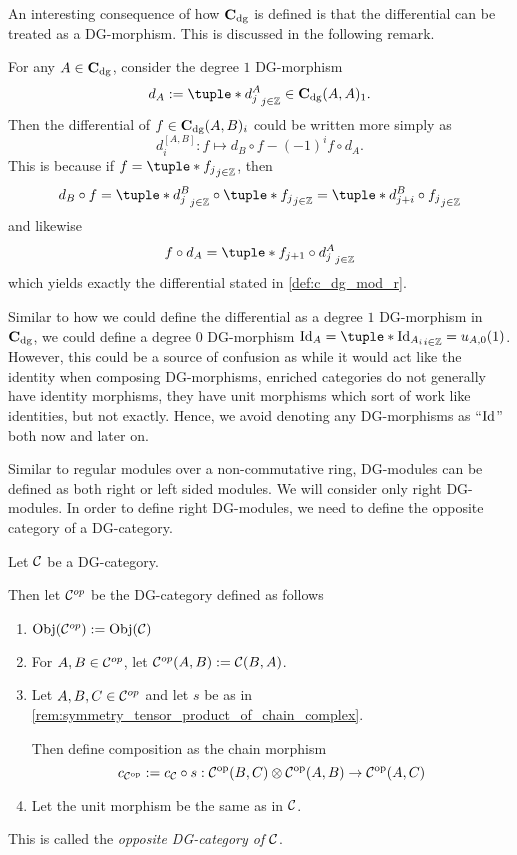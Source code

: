 An interesting consequence of how \( \operatorname{\mathbf{C}}_{\operatorname{dg}} \) is defined is that the differential can be treated as a DG-morphism. This is discussed in the following remark.
\begin{remark}
    \label{rem:c_dg_differential}
    For any \( A \in \operatorname{\mathbf{C}}_{\operatorname{dg}} \), consider the degree \( 1 \) DG-morphism
    \[
        d_A := \tuple*{ d_j^A }_{j \in \Zb} \in \C_{\dg}(A, A)_1.
    \]
    Then the differential of \( f \in \operatorname{\mathbf{C}}_{\operatorname{dg}}(A, B)_i \) could be written more simply as
    \[
        d_i^{[A, B]}: f \mapsto d_B \circ f - (-1)^i f \circ d_A.
    \]
    This is because if \( f = \tuple*{f_j}_{j \in \Zb} \), then
    \[
        d_B \circ f = \tuple*{d_j^B }_{j \in \Zb} \circ \tuple*{ f_j }_{j \in \Zb} = \tuple*{ d_{j + i}^B \circ f_j }_{j \in \Zb}
    \]
    and likewise
    \[
        f \circ d_A = \tuple*{f_{j + 1} \circ d_j^A}_{j \in \Zb}
    \]
    which yields exactly the differential stated in \autoref{def:c_dg_mod_r}.
\end{remark}

Similar to how we could define the differential as a degree \( 1 \) DG-morphism in \( \operatorname{\mathbf{C}}_{\operatorname{dg}} \), we could define a degree \( 0 \) DG-morphism \( \Id_A = \tuple*{ \Id_{A_i} }_{i \in \Zb} = u_{A, 0}(1) \). However, this could be a source of confusion as while it would act like the identity when composing DG-morphisms, enriched categories do not generally have identity morphisms, they have unit morphisms which sort of work like identities, but not exactly. Hence, we avoid denoting any DG-morphisms as ``\( \operatorname{Id} \)'' both now and later on.

Similar to regular modules over a non-commutative ring, DG-modules can be defined as both right or left sided modules. We will consider only right DG-modules. In order to define right DG-modules, we need to define the opposite category of a DG-category.

\begin{definition}
    \label{def:opposite_dg_category}
    Let \( {\mathcal{C}} \) be a DG-category.

    Then let \( {\mathcal{C}}^{op} \) be the DG-category defined as follows
    \begin{enumerate}
        \item {
            \( \operatorname{Obj}({\mathcal{C}}^{op}) := \operatorname{Obj}({\mathcal{C}}) \)
        }
        \item {
            For \( A, B \in {\mathcal{C}}^{op} \), let \( {\mathcal{C}}^{op}(A, B) := {\mathcal{C}}(B, A) \).
        }
        \item {
            Let \( A, B, C \in {\mathcal{C}}^{op} \) and let \( s \) be as in \autoref{rem:symmetry_tensor_product_of_chain_complex}.
            
            Then define composition as the chain morphism
            \[
                c_{{\mathcal{C}}^{\operatorname{op}}} :=  c_{{\mathcal{C}}} \circ s: {\mathcal{C}}^{\operatorname{op}} (B, C) \otimes {\mathcal{C}}^{\operatorname{op}} (A, B) \to {\mathcal{C}}^{\operatorname{op}} (A, C)
            \]
        }
        \item {
            Let the unit morphism be the same as in \( {\mathcal{C}} \).
        }
    \end{enumerate}
    This is called the \emph{opposite DG-category of \( {\mathcal{C}} \)}.
\end{definition}


